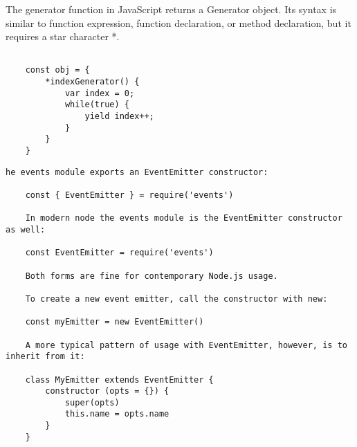 \documentclass{scrartcl}
\begin{document}
The generator function in JavaScript returns a Generator object.
Its syntax is similar to function expression, function declaration, or method declaration, but it requires a star character *.

\begin{lstlisting}[style=ES6]

    const obj = {
        *indexGenerator() {
            var index = 0;
            while(true) {
                yield index++;
            }
        }
    }

\end{lstlisting}


\begin{lstlisting}[style=ES6]
    he events module exports an EventEmitter constructor:

    const { EventEmitter } = require('events')

    In modern node the events module is the EventEmitter constructor as well:

    const EventEmitter = require('events')

    Both forms are fine for contemporary Node.js usage.

    To create a new event emitter, call the constructor with new:

    const myEmitter = new EventEmitter()

    A more typical pattern of usage with EventEmitter, however, is to inherit from it:

    class MyEmitter extends EventEmitter {
        constructor (opts = {}) {
            super(opts)
            this.name = opts.name
        }
    }

\end{lstlisting}

\begin{lstlisting}[style=ES6]

\end{lstlisting}

\begin{lstlisting}[style=ES6]

\end{lstlisting}

\begin{lstlisting}[style=ES6]

\end{lstlisting}
\end{document}
